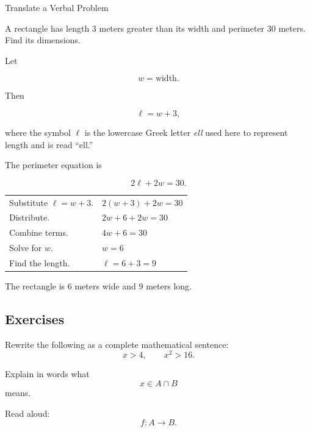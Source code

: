 \begin{workedexamplebox}{Translate a Verbal Problem}

A rectangle has length \(3\) meters greater than its width and perimeter
\(30\) meters. Find its dimensions.

Let

\[ w=\text{width}. \]

Then

\[ \ell=w+3, \]

where the symbol \(\ell\) is the lowercase Greek letter \emph{ell} used here
to represent length and is read ``ell.''

The perimeter equation is

\[ 2\ell+2w=30. \]

\begin{tabularx}{\textwidth}{@{}>{\raggedright\arraybackslash}p{}X@{}}
Substitute \(\ell=w+3\). & \(2(w+3)+2w=30\)\\
Distribute. & \(2w+6+2w=30\)\\
Combine terms. & \(4w+6=30\)\\
Solve for \(w\). & \(w=6\)\\
Find the length. & \(\ell=6+3=9\)
\end{tabularx}

\begin{answerbox}
The rectangle is \(6\) meters wide and \(9\) meters long.
\end{answerbox}
\end{workedexamplebox}

\subsection{Exercises}
\label{subsec:mathematical-writing-exercises}

\begin{exercise}[1]
Rewrite the following as a complete mathematical sentence:
\[ x>4,\qquad x^2>16. \]
\end{exercise}

\begin{exercise}[1]
Explain in words what
\[ x\in A\cap B \]
means.
\end{exercise}

\begin{exercise}[1]
Read aloud:
\[ f:A\to B. \]
\end{exercise}

